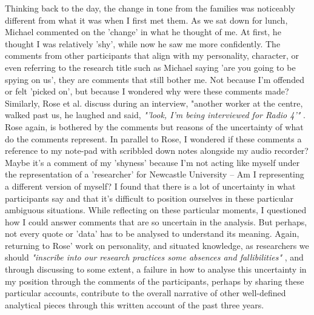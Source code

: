 Thinking back to the day, the change in tone from the families was noticeably different from what it was when I first met them. As we sat down for lunch, Michael commented on the 'change' in what he thought of me. At first, he thought I was relatively 'shy', while now he saw me more confidently. The comments from other participants that align with my personality, character, or even referring to the research title such as Michael saying 'are you going to be spying on us', they are comments that still bother me. Not because I'm offended or felt 'picked on', but because I wondered why were these comments made? Similarly, Rose et al. discuss during an interview, "another worker at the centre, walked past us, he laughed and said, \textit{"'look, I'm being interviewed for Radio 4'"} \citep{rose_situating_1997}. Rose again, is bothered by the comments but reasons of the uncertainty of what do the comments represent. In parallel to Rose, I wondered if these comments a reference to my note-pad with scribbled down notes alongside my audio recorder? Maybe it's a comment of my 'shyness' because I'm not acting like myself under the representation of a 'researcher' for Newcastle University – Am I representing a different version of myself?  I found that there is a lot of uncertainty in what participants say and that it's difficult to position ourselves in these particular ambiguous situations. While reflecting on these particular moments, I questioned how I could answer comments that are so uncertain in the analysis. But perhaps, not every quote or 'data' has to be analysed to understand its meaning. Again, returning to Rose' work on personality, and situated knowledge, as researchers we should \textit{"inscribe into our research practices some absences and fallibilities"} \citep{rose_situating_1997}, and through discussing to some extent, a failure in how to analyse this uncertainty in my position through the comments of the participants, perhaps by sharing these particular accounts, contribute to the overall narrative of other well-defined analytical pieces through this written account of the past three years.

